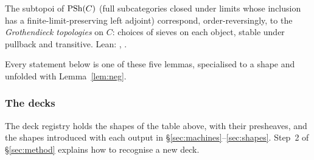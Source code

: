\begin{bridge}[Subtopoi]\label{br:sub}
The subtopoi of $\mathrm{PSh}(C)$ (full subcategories closed under limits whose inclusion has a finite-limit-preserving left adjoint) correspond, order-reversingly, to the \emph{Grothendieck topologies} on $C$: choices of  sieves on each object, stable under pullback and transitive. Lean: , .
\end{bridge}

Every statement below is one of these five lemmas, specialised to a shape and unfolded with Lemma~\ref{lem:neg}.

\subsubsection{The decks}

The deck registry holds the shapes of the table above, with their presheaves, and the shapes introduced with each output in \S\ref{sec:machines}--\ref{sec:shapes}. Step~2 of \S\ref{sec:method} explains how to recognise a new deck.
